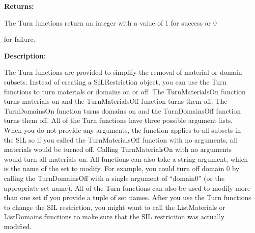 \documentclass[letterpaper,10pt,english]{sphinxmanual}
\begin{document}
\begin{DUlineblock}{0em}
\item[] 
\item[] \textbf{Returns:}
\item[] The Turn functions return an integer with a value of 1 for success or 0
\item[] for failure.
\item[] 
\item[] \textbf{Description:}
\item[] The Turn functions are provided to simplify the removal of material or
domain subsets. Instead of creating a SILRestriction object, you can use
the Turn functions to turn materials or domains on or off. The
TurnMaterialsOn function turns materials on and the TurnMaterialsOff
function turns them off. The TurnDomainsOn function turns domains on and
the TurnDomainsOff function turns them off. All of the Turn functions have
three possible argument lists. When you do not provide any arguments, the
function applies to all subsets in the SIL so if you called the
TurnMaterialsOff function with no arguments, all materials would be turned
off. Calling TurnMaterialsOn with no arguments would turn all materials on.
All functions can also take a string argument, which is the name of the set
to modify. For example, you could turn off domain 0 by calling the
TurnDomainsOff with a single argument of ``domain0'' (or the appropriate
set name). All of the Turn functions can also be used to modify more than
one set if you provide a tuple of set names. After you use the Turn
functions to change the SIL restriction, you might want to call the
ListMaterials or ListDomains functions to make sure that the SIL
restriction was actually modified.
\end{DUlineblock}

\begin{DUlineblock}{0em}
\item[] 
\end{DUlineblock}
\end{document}
